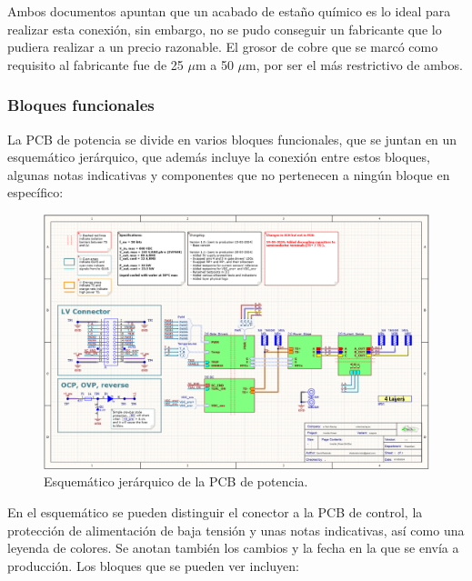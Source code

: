 Ambos documentos apuntan que un acabado de estaño químico es lo ideal para realizar esta conexión, sin embargo, no se pudo conseguir un fabricante que lo pudiera realizar a un precio razonable. El grosor de cobre que se marcó como requisito al fabricante fue de 25 $\mu$m a 50 $\mu$m, por ser el más restrictivo de ambos.

\subsubsection{Bloques funcionales}

La PCB de potencia se divide en varios bloques funcionales, que se juntan en un esquemático jerárquico, que además incluye la conexión entre estos bloques, algunas notas indicativas y componentes que no pertenecen a ningún bloque en específico:

\begin{figure}[H]
	\centering
	\includegraphics[width=0.8\linewidth]{fig/schPower1}
	\caption{Esquemático jerárquico de la PCB de potencia.}
\end{figure}

En el esquemático se pueden distinguir el conector a la PCB de control, la protección de alimentación de baja tensión y unas notas indicativas, así como una leyenda de colores. Se anotan también los cambios y la fecha en la que se envía a producción. Los bloques que se pueden ver incluyen:


